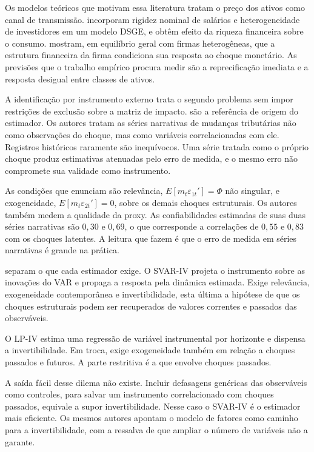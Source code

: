 \documentclass[
article,			%
12pt,				%
oneside,			%
a4paper,			%
hidelinks, 
english,			%
brazil,				%
]{abntex2}
\theoremstyle{plain}
\theoremstyle{definition}
\theoremstyle{remark}
\begin{document}
Os modelos teóricos que motivam essa literatura tratam o preço dos ativos como canal de transmissão.  incorporam rigidez nominal de salários e heterogeneidade de investidores em um modelo DSGE, e obtêm efeito da riqueza financeira sobre o consumo.  mostram, em equilíbrio geral com firmas heterogêneas, que a estrutura financeira da firma condiciona sua resposta ao choque monetário. As previsões que o trabalho empírico procura medir são a reprecificação imediata e a resposta desigual entre classes de ativos.

A identificação por instrumento externo trata o segundo problema sem impor restrições de exclusão sobre a matriz de impacto.  são a referência de origem do estimador. Os autores tratam as séries narrativas de mudanças tributárias não como observações do choque, mas como variáveis correlacionadas com ele. Registros históricos raramente são inequívocos. Uma série tratada como o próprio choque produz estimativas atenuadas pelo erro de medida, e o mesmo erro não compromete sua validade como instrumento.

As condições que enunciam são relevância, $E[m_t \varepsilon_{1t}'] = \Phi$ não singular, e exogeneidade, $E[m_t \varepsilon_{2t}'] = 0$, sobre os demais choques estruturais. Os autores também medem a qualidade da proxy. As confiabilidades estimadas de suas duas séries narrativas são $0{,}30$ e $0{,}69$, o que corresponde a correlações de $0{,}55$ e $0{,}83$ com os choques latentes. A leitura que fazem é que o erro de medida em séries narrativas é grande na prática.

 separam o que cada estimador exige. O SVAR-IV projeta o instrumento sobre as inovações do VAR e propaga a resposta pela dinâmica estimada. Exige relevância, exogeneidade contemporânea e invertibilidade, esta última a hipótese de que os choques estruturais podem ser recuperados de valores correntes e passados das observáveis.

O LP-IV estima uma regressão de variável instrumental por horizonte e dispensa a invertibilidade. Em troca, exige exogeneidade também em relação a choques passados e futuros. A parte restritiva é a que envolve choques passados.

A saída fácil desse dilema não existe. Incluir defasagens genéricas das observáveis como controles, para salvar um instrumento correlacionado com choques passados, equivale a supor invertibilidade. Nesse caso o SVAR-IV é o estimador mais eficiente. Os mesmos autores apontam o modelo de fatores como caminho para a invertibilidade, com a ressalva de que ampliar o número de variáveis não a garante.
\end{document}
